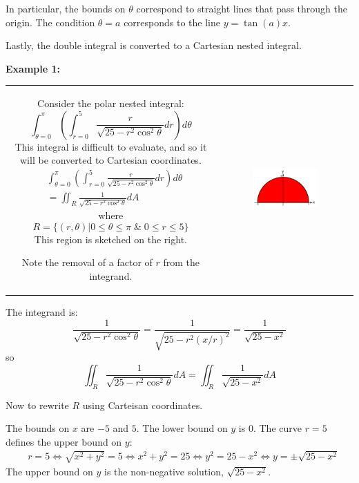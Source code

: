 \documentclass{article}
\begin{document}
In particular, the bounds on \(\theta\) correspond to straight lines that pass through the origin. The condition \(\theta = a\) corresponds to the line \(y = \tan(a) x\). 

Lastly, the double integral is converted to a Cartesian nested integral.





\vspace{5mm}

\textbf{Example 1:}

\vspace{5mm}

\begin{tabular}{cc}
\parbox{0.5\textwidth}{
Consider the polar nested integral:
\[\int_{\theta = 0}^{\pi} \left(\int_{r = 0}^{5} \frac{r}{\sqrt{25 - r^2\cos^2\theta}} dr\right)d\theta\] 
This integral is difficult to evaluate, and so it will be converted to Cartesian coordinates. 
\begin{align*}
& \int_{\theta = 0}^{\pi} \left(\int_{r = 0}^{5} \frac{r}{\sqrt{25 - r^2\cos^2\theta}} dr\right)d\theta \\
& = \iint_R \frac{1}{\sqrt{25 - r^2\cos^2\theta}} dA
\end{align*} 
where 
\[R = \Big\{(r,\theta) \Big| 0 \leq \theta \leq \pi \;\&\; 0 \leq r \leq 5\Big\}\]   
This region is sketched on the right. 

Note the removal of a factor of \(r\) from the integrand.
} & \parbox{0.5\textwidth}{
\includegraphics[width = 0.5\textwidth]{Polar_region_8}
}
\end{tabular}

\vspace{5mm}

The integrand is:
\[\frac{1}{\sqrt{25 - r^2\cos^2\theta}} = \frac{1}{\sqrt{25 - r^2(x/r)^2}} = \frac{1}{\sqrt{25 - x^2}}\]
so
\[\iint_R \frac{1}{\sqrt{25 - r^2\cos^2\theta}} dA = \iint_R \frac{1}{\sqrt{25 - x^2}} dA\]

Now to rewrite \(R\) using Carteisan coordinates. 

The bounds on \(x\) are \(-5\) and \(5\). The lower bound on \(y\) is \(0\). The curve \(r = 5\) defines the upper bound on \(y\):
\begin{align*}
& r = 5 
\iff \sqrt{x^2 + y^2} = 5 
\iff x^2 + y^2 = 25 
\iff y^2 = 25 - x^2 
\iff y = \pm\sqrt{25 - x^2}
\end{align*}
The upper bound on \(y\) is the non-negative solution, \(\sqrt{25 - x^2}\).
\end{document}
